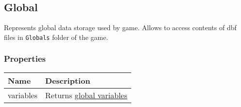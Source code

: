\subsection{Global}
\label{Global}
Represents global data storage used by game. Allows to access contents of dbf files in \texttt{Globals} folder of the game.
\subsubsection{Properties}
\begin{center}
\begin{tabularx}{\linewidth}{| l | X |}
\hline
\textbf{Name} & \textbf{Description} \\
\hline
variables & Returns \hyperref[GlobalVariables]{global variables}\\
\hline
\end{tabularx}
\end{center}
